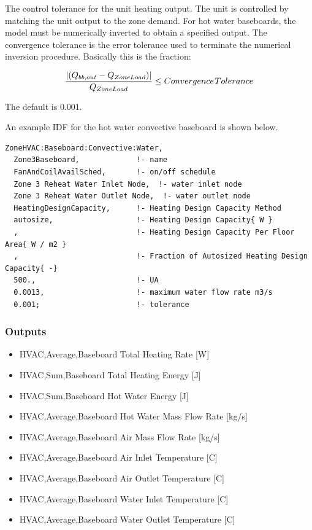 The control tolerance for the unit heating output. The unit is controlled by matching the unit output to the zone demand. For hot water baseboards, the model must be numerically inverted to obtain a specified output. The convergence tolerance is the error tolerance used to terminate the numerical inversion procedure. Basically this is the fraction:

\begin{equation}
\frac{{\left| {({Q_{bb,out}} - {Q_{ZoneLoad}})} \right|}}{{{Q_{ZoneLoad}}}} \le Convergence{\kern 1pt} Tolerance
\end{equation}

The default is 0.001.

An example IDF for the hot water convective baseboard is shown below.

\begin{lstlisting}
ZoneHVAC:Baseboard:Convective:Water,
  Zone3Baseboard,             !- name
  FanAndCoilAvailSched,       !- on/off schedule
  Zone 3 Reheat Water Inlet Node,  !- water inlet node
  Zone 3 Reheat Water Outlet Node,  !- water outlet node
  HeatingDesignCapacity,      !- Heating Design Capacity Method
  autosize,                   !- Heating Design Capacity{ W }
  ,                           !- Heating Design Capacity Per Floor Area{ W / m2 }
  ,                           !- Fraction of Autosized Heating Design Capacity{ -}
  500.,                       !- UA
  0.0013,                     !- maximum water flow rate m3/s
  0.001;                      !- tolerance
\end{lstlisting}

\subsubsection{Outputs}\label{outputs-3-015}

\begin{itemize}
\item
  HVAC,Average,Baseboard Total Heating Rate {[}W{]}
\item
  HVAC,Sum,Baseboard Total Heating Energy {[}J{]}
\item
  HVAC,Sum,Baseboard Hot Water Energy {[}J{]}
\item
  HVAC,Average,Baseboard Hot Water Mass Flow Rate {[}kg/s{]}
\item
  HVAC,Average,Baseboard Air Mass Flow Rate {[}kg/s{]}
\item
  HVAC,Average,Baseboard Air Inlet Temperature {[}C{]}
\item
  HVAC,Average,Baseboard Air Outlet Temperature {[}C{]}
\item
  HVAC,Average,Baseboard Water Inlet Temperature {[}C{]}
\item
  HVAC,Average,Baseboard Water Outlet Temperature {[}C{]}
\end{itemize}

